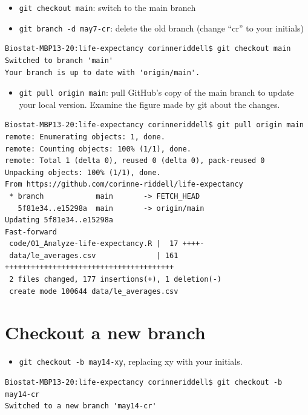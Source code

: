 \documentclass[
]{book}
\providecommand{\tightlist}{%
  \setlength{\itemsep}{0pt}\setlength{\parskip}{0pt}}
\begin{document}
\begin{itemize}
\tightlist
\item
  \texttt{git\ checkout\ main}: switch to the main branch
\item
  \texttt{git\ branch\ -d\ may7-cr}: delete the old branch (change ``cr'' to your initials)
\end{itemize}

\begin{verbatim}
Biostat-MBP13-20:life-expectancy corinneriddell$ git checkout main
Switched to branch 'main'
Your branch is up to date with 'origin/main'.
\end{verbatim}

\begin{itemize}
\tightlist
\item
  \texttt{git\ pull\ origin\ main}: pull GitHub's copy of the main branch to update your
  local version. Examine the figure made by git about the changes.
\end{itemize}

\begin{verbatim}
Biostat-MBP13-20:life-expectancy corinneriddell$ git pull origin main
remote: Enumerating objects: 1, done.
remote: Counting objects: 100% (1/1), done.
remote: Total 1 (delta 0), reused 0 (delta 0), pack-reused 0
Unpacking objects: 100% (1/1), done.
From https://github.com/corinne-riddell/life-expectancy
 * branch            main       -> FETCH_HEAD
   5f81e34..e15298a  main       -> origin/main
Updating 5f81e34..e15298a
Fast-forward
 code/01_Analyze-life-expectancy.R |  17 ++++-
 data/le_averages.csv              | 161 +++++++++++++++++++++++++++++++++++++++
 2 files changed, 177 insertions(+), 1 deletion(-)
 create mode 100644 data/le_averages.csv
\end{verbatim}

\hypertarget{checkout-a-new-branch}{%
\section{Checkout a new branch}\label{checkout-a-new-branch}}

\begin{itemize}
\tightlist
\item
  \texttt{git\ checkout\ -b\ may14-xy}, replacing xy with your initials.
\end{itemize}

\begin{verbatim}
Biostat-MBP13-20:life-expectancy corinneriddell$ git checkout -b may14-cr
Switched to a new branch 'may14-cr'
\end{verbatim}
\end{document}
